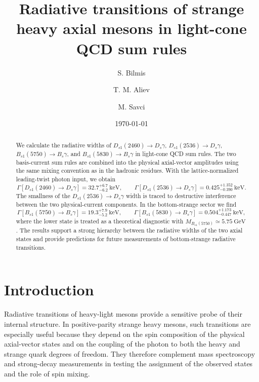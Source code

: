 \documentclass[aps,prd,preprint,nofootinbib,superscriptaddress]{revtex4-2}
\newcommand{\Ds}{D_s}
\newcommand{\Dsone}{D_{s1}}
\newcommand{\Bs}{B_s}
\newcommand{\Bsone}{B_{s1}}
\newcommand{\GeV}{\mathrm{GeV}}
\newcommand{\keV}{\mathrm{keV}}
\begin{document}
\title{Radiative transitions of strange heavy axial mesons in light-cone QCD sum rules}

\author{S. Bilmis}
\author{T. M. Aliev}
\author{M. Savci}

\date{\today}

\begin{abstract}
We calculate the radiative widths of
$\Dsone(2460)\to\Ds\gamma$, $\Dsone(2536)\to\Ds\gamma$,
$\Bsone(5750)\to\Bs\gamma$, and $\Bsone(5830)\to\Bs\gamma$
in light-cone QCD sum rules.  The two basis-current sum rules are combined
into the physical axial-vector amplitudes using the same mixing convention
as in the hadronic residues.  With the lattice-normalized leading-twist photon
input, we obtain
\[
\Gamma[\Dsone(2460)\to\Ds\gamma]
   =32.7^{+6.7}_{-6.2}~\keV,
\qquad
\Gamma[\Dsone(2536)\to\Ds\gamma]
   =0.425^{+1.352}_{-0.390}~\keV .
\]
The smallness of the $\Dsone(2536)\to\Ds\gamma$ width is traced to destructive
interference between the two physical-current components.  In the
bottom-strange sector we find
\[
\Gamma[\Bsone(5750)\to\Bs\gamma]
   =19.3^{+7.9}_{-5.2}~\keV,
\qquad
\Gamma[\Bsone(5830)\to\Bs\gamma]
   =0.504^{+1.173}_{-0.447}~\keV ,
\]
where the lower state is treated as a theoretical diagnostic with
$M_{\Bsone(5750)}\simeq5.75~\GeV$.  The results support a strong hierarchy
between the radiative widths of the two axial states and provide predictions
for future measurements of bottom-strange radiative transitions.
\end{abstract}

\maketitle



\section{Introduction}
\label{sec:intro}

Radiative transitions of heavy-light mesons provide a sensitive probe of their
internal structure.  In positive-parity strange heavy mesons, such transitions
are especially useful because they depend on the spin composition of the
physical axial-vector states and on the coupling of the photon to both the
heavy and strange quark degrees of freedom.  They therefore complement mass
spectroscopy and strong-decay measurements in testing the assignment of the
observed states and the role of spin mixing.
\end{document}
